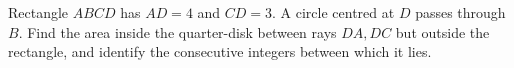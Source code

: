 Rectangle $ABCD$ has $AD=4$ and $CD=3$. A circle centred at $D$ passes through $B$. Find the area inside the quarter-disk between rays $DA,DC$ but outside the rectangle, and identify the consecutive integers between which it lies.
